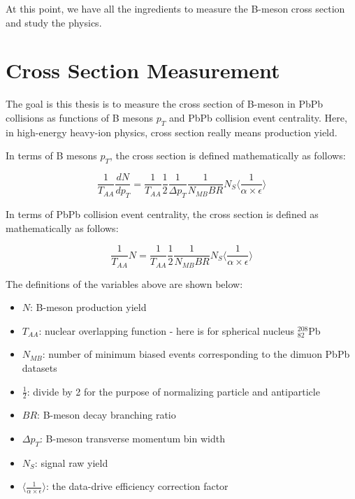 At this point, we have all the ingredients to measure the B-meson cross section and study the physics. 

\section{Cross Section Measurement} 

The goal is this thesis is to measure the cross section of B-meson in PbPb collisions as functions of B mesons $p_T$ and PbPb collision event centrality. Here, in high-energy heavy-ion physics, cross section really means production yield. 

In terms of B mesons $p_T$, the cross section is defined mathematically as follows:

\begin{equation}
\frac{1}{T_{AA}}\frac{dN}{d p_T} =  \frac{1}{T_{AA}} \frac{1}{2} \frac{1}{\Delta p_T} \frac{1}{N_{MB} BR } N_S \langle\frac{1}{\alpha \times \epsilon} \rangle
\end{equation}

In terms of PbPb collision event centrality, the cross section is defined as mathematically as follows:

\begin{equation}
\frac{1}{T_{AA}} N =  \frac{1}{T_{AA}} \frac{1}{2} \frac{1}{N_{MB} BR} N_S \langle\frac{1}{\alpha \times \epsilon} \rangle
\end{equation}

The definitions of the variables above are shown below:

\begin{itemize}
\item $N$: B-meson production yield
\item $T_{AA}$: nuclear overlapping function - here is for spherical nucleus ${}^{208}_{82}$Pb  
\item $N_{MB}$: number of minimum biased events corresponding to the dimuon PbPb datasets
\item $\frac{1}{2}$: divide by 2 for the purpose of normalizing particle and antiparticle 
\item $BR$: B-meson decay branching ratio
\item $\Delta p_T$: B-meson transverse momentum bin width
\item $N_S$: signal raw yield 
\item $\langle\frac{1}{\alpha \times \epsilon} \rangle$: the data-drive efficiency correction factor
\end{itemize}

